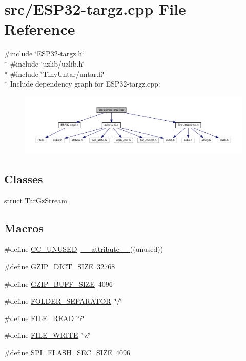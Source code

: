 \hypertarget{ESP32-targz_8cpp}{}\section{src/\+E\+S\+P32-\/targz.cpp File Reference}
\label{ESP32-targz_8cpp}
{\ttfamily \#include \char`\"{}E\+S\+P32-\/targz.\+h\char`\"{}}\\*
{\ttfamily \#include \char`\"{}uzlib/uzlib.\+h\char`\"{}}\\*
{\ttfamily \#include \char`\"{}Tiny\+Untar/untar.\+h\char`\"{}}\\*
Include dependency graph for E\+S\+P32-\/targz.cpp\+:
\nopagebreak
\begin{figure}[H]
\begin{center}
\leavevmode
\includegraphics[width=350pt]{ESP32-targz_8cpp__incl}
\end{center}
\end{figure}
\subsection*{Classes}
\begin{DoxyCompactItemize}
\item 
struct \hyperlink{structTarGzStream}{Tar\+Gz\+Stream}
\end{DoxyCompactItemize}
\subsection*{Macros}
\begin{DoxyCompactItemize}
\item 
\#define \hyperlink{ESP32-targz_8cpp_a88f6b33e1b3dd06a431809c0b41fccfa}{C\+C\+\_\+\+U\+N\+U\+S\+ED}~\hyperlink{untar_8c_a36f229bbda63818246ec86181b1fdd42}{\+\_\+\+\_\+attribute\+\_\+\+\_\+}((unused))
\item 
\#define \hyperlink{ESP32-targz_8cpp_afeb89dc5dda4a163aebb2a0195941db3}{G\+Z\+I\+P\+\_\+\+D\+I\+C\+T\+\_\+\+S\+I\+ZE}~32768
\item 
\#define \hyperlink{ESP32-targz_8cpp_ab570e96e8879b39cfc62a83a131ac42c}{G\+Z\+I\+P\+\_\+\+B\+U\+F\+F\+\_\+\+S\+I\+ZE}~4096
\item 
\#define \hyperlink{ESP32-targz_8cpp_a6cddaf6595a84ce83082840a98ca51a8}{F\+O\+L\+D\+E\+R\+\_\+\+S\+E\+P\+A\+R\+A\+T\+OR}~\char`\"{}/\char`\"{}
\item 
\#define \hyperlink{ESP32-targz_8cpp_ad52d51659a75e25d96fb04d22ff718cb}{F\+I\+L\+E\+\_\+\+R\+E\+AD}~\char`\"{}r\char`\"{}
\item 
\#define \hyperlink{ESP32-targz_8cpp_ace34e503254fa9004599ddf122264c8f}{F\+I\+L\+E\+\_\+\+W\+R\+I\+TE}~\char`\"{}w\char`\"{}
\item 
\#define \hyperlink{ESP32-targz_8cpp_a518257817c69fec25290c1bebad544b0}{S\+P\+I\+\_\+\+F\+L\+A\+S\+H\+\_\+\+S\+E\+C\+\_\+\+S\+I\+ZE}~4096
\end{DoxyCompactItemize}
